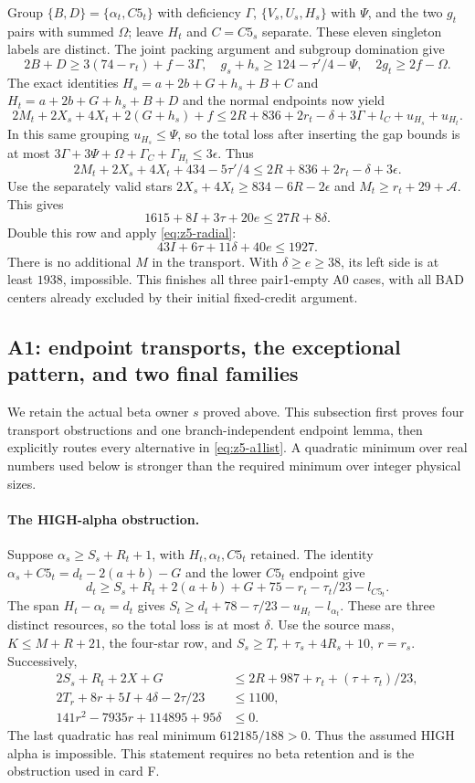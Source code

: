 \documentclass[11pt,letterpaper]{article}
\theoremstyle{definition}\newtheorem{definition}[theorem]{Definition}
\begin{document}
Group $\{B,D\}=\{\alpha_t,C5_t\}$ with deficiency $\Gamma$,
$\{V_s,U_s,H_s\}$ with $\Psi$, and the two $g_t$ pairs with
summed $\Omega$; leave $H_t$ and $C=C5_s$ separate.
These eleven singleton labels are distinct. The joint packing argument
and subgroup domination give
\[
 2B+D\ge3(74-r_t)+f-3\Gamma,\quad
 g_s+h_s\ge124-\tau'/4-\Psi,\quad 2g_t\ge2f-\Omega.
\]
The exact identities
$H_s=a+2b+G+h_s+B+C$ and
$H_t=a+2b+G+h_s+B+D$ and the normal endpoints now yield
\[
 2M_t+2X_s+4X_t+2(G+h_s)+f
 \le2R+836+2r_t-\delta+3\Gamma+l_C+u_{H_s}+u_{H_t}.
\]
In this same grouping $u_{H_s}\le\Psi$, so the total loss after
inserting the gap bounds is at most
$3\Gamma+3\Psi+\Omega+\Gamma_C+\Gamma_{H_t}\le3\epsilon$.
Thus
\[
 2M_t+2X_s+4X_t+434-5\tau'/4
 \le2R+836+2r_t-\delta+3\epsilon.
\]
Use the separately valid stars
$2X_s+4X_t\ge834-6R-2\epsilon$ and
$M_t\ge r_t+29+\mathcal A$. This gives
\[
 1615+8I+3\tau+20e\le27R+8\delta.
\]
Double this row and apply \eqref{eq:z5-radial}:
\begin{equation}\label{eq:z5-alpha-final}
 \boxed{43I+6\tau+11\delta+40e\le1927.}
\end{equation}
There is no additional $M$ in the transport. With
$\delta\ge e\ge38$, its left side is at least $1938$, impossible.
This finishes all three pair1-empty A0 cases, with all BAD centers already
excluded by their initial fixed-credit argument.

\subsection{A1: endpoint transports, the exceptional pattern, and two final families}
We retain the actual beta owner $s$ proved above. This subsection first
proves four transport obstructions and one branch-independent endpoint
lemma, then explicitly routes every alternative in
\eqref{eq:z5-a1list}. A quadratic minimum over real numbers used below
is stronger than the required minimum over integer physical sizes.

\paragraph{The HIGH-alpha obstruction.}\label{par:z5-highalpha}
Suppose $\alpha_s\ge S_s+R_t+1$, with $H_t,\alpha_t,C5_t$ retained.
The identity $\alpha_s+C5_t=d_t-2(a+b)-G$ and the lower $C5_t$
endpoint give
\[
 d_t\ge S_s+R_t+2(a+b)+G+75-r_t-\tau_t/23-l_{C5_t}.
\]
The span $H_t-\alpha_t=d_t$ gives
$S_t\ge d_t+78-\tau/23-u_{H_t}-l_{\alpha_t}$.
These are three distinct resources, so the total loss is at most
$\delta$. Use the source mass, $K\le M+R+21$, the four-star row,
and $S_s\ge T_r+\tau_s+4R_s+10$, $r=r_s$. Successively,
\[
\begin{split}
 2S_s+R_t+2X+G&\le2R+987+r_t+(\tau+\tau_t)/23,\\
 2T_r+8r+5I+4\delta-2\tau/23&\le1100,\\
 141r^2-7935r+114895+95\delta&\le0.
\end{split}
\]
The last quadratic has real minimum $612185/188>0$. Thus the
assumed HIGH alpha is impossible. This statement requires no beta
retention and is the obstruction used in card F.
\end{document}

